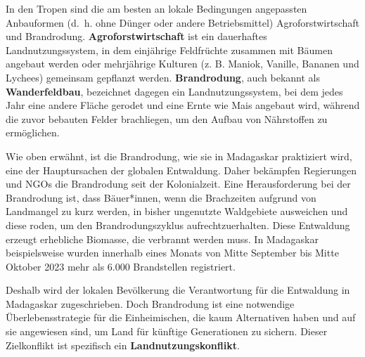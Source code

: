 \documentclass[
  nswissgerman,
  a4paper,
  DIV=11,
  numbers=noendperiod,
  oneside,
  openany]{scrreprt}
\begin{document}
\begin{tcolorbox}[enhanced jigsaw, arc=.35mm, bottomrule=.15mm, bottomtitle=1mm, breakable, colback=white, colbacktitle=quarto-callout-tip-color!10!white, colframe=quarto-callout-tip-color-frame, coltitle=black, left=2mm, leftrule=.75mm, opacityback=0, opacitybacktitle=0.6, rightrule=.15mm, title={Landnutzungsveränderungen in den Tropen: das Beispiel Madagaskar}, titlerule=0mm, toprule=.15mm, toptitle=1mm]

In den Tropen sind die am besten an lokale Bedingungen angepassten
Anbauformen (d.~h. ohne Dünger oder andere Betriebsmittel)
Agroforstwirtschaft und Brandrodung. \textbf{Agroforstwirtschaft} ist
ein dauerhaftes Landnutzungssystem, in dem einjährige Feldfrüchte
zusammen mit Bäumen angebaut werden oder mehrjährige Kulturen (z. B.
Maniok, Vanille, Bananen und Lychees) gemeinsam gepflanzt werden.
\textbf{Brandrodung}, auch bekannt als \textbf{Wanderfeldbau},
bezeichnet dagegen ein Landnutzungssystem, bei dem jedes Jahr eine
andere Fläche gerodet und eine Ernte wie Mais angebaut wird, während die
zuvor bebauten Felder brachliegen, um den Aufbau von Nährstoffen zu
ermöglichen.

Wie oben erwähnt, ist die Brandrodung, wie sie in Madagaskar praktiziert
wird, eine der Hauptursachen der globalen Entwaldung. Daher bekämpfen
Regierungen und NGOs die Brandrodung seit der Kolonialzeit. Eine
Herausforderung bei der Brandrodung ist, dass Bäuer*innen, wenn die
Brachzeiten aufgrund von Landmangel zu kurz werden, in bisher ungenutzte
Waldgebiete ausweichen und diese roden, um den Brandrodungszyklus
aufrechtzuerhalten. Diese Entwaldung erzeugt erhebliche Biomasse, die
verbrannt werden muss. In Madagaskar beispielsweise wurden innerhalb
eines Monats von Mitte September bis Mitte Oktober 2023 mehr als 6.000
Brandstellen registriert.

Deshalb wird der lokalen Bevölkerung die Verantwortung für die
Entwaldung in Madagaskar zugeschrieben. Doch Brandrodung ist eine
notwendige Überlebensstrategie für die Einheimischen, die kaum
Alternativen haben und auf sie angewiesen sind, um Land für künftige
Generationen zu sichern. Dieser Zielkonflikt ist spezifisch ein
\textbf{Landnutzungskonflikt}.

\end{tcolorbox}
\end{document}

